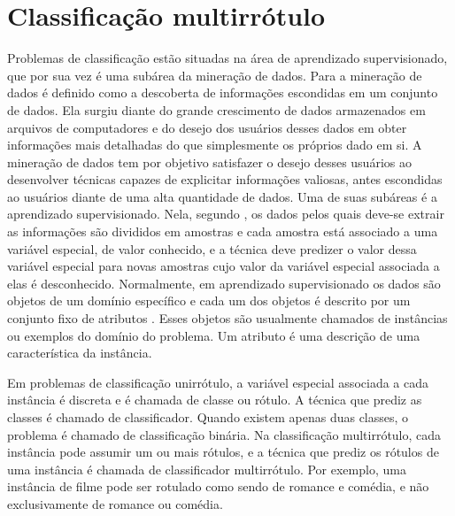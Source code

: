 \chapter{Classificação multirrótulo}

Problemas de classificação estão situadas na área de aprendizado supervisionado, que por sua vez é uma 
subárea da mineração de dados. Para \cite{dunham2003introductory} a mineração de dados é definido como a descoberta
de informações escondidas em um conjunto de dados. Ela surgiu diante do grande crescimento de dados armazenados
em arquivos de computadores e do desejo dos usuários desses dados em obter informações mais detalhadas do que simplesmente
os próprios dado em si. A mineração de dados tem por objetivo satisfazer o desejo desses usuários ao desenvolver técnicas
capazes de explicitar informações valiosas, antes escondidas ao usuários diante de uma alta quantidade de dados.
Uma de suas subáreas é a aprendizado supervisionado. Nela, segundo \cite{mohri2012foundations},
os dados pelos quais deve-se extrair as informações são divididos em amostras
e cada amostra está associado a uma variável especial, de valor conhecido,
e a técnica deve predizer o valor dessa variável especial para
novas amostras cujo valor da variável especial associada a elas é desconhecido. 
Normalmente, em aprendizado supervisionado os dados são objetos de um domínio específico e cada um dos objetos
é descrito por um conjunto fixo de atributos \cite{rezende2003sistemas}. 
Esses objetos são usualmente chamados de instâncias ou exemplos do domínio do problema.
Um atributo é uma descrição de uma característica da instância.

Em problemas de classificação unirrótulo, a variável especial associada a cada instância é discreta
e é chamada de classe ou rótulo. A técnica que prediz as classes é chamado de classificador.
Quando existem apenas duas classes, o problema é chamado de classificação binária.
Na classificação multirrótulo, cada instância pode assumir um ou mais rótulos, e a técnica
que prediz os rótulos de uma instância é chamada de classificador multirrótulo.
Por exemplo, uma instância de filme pode ser rotulado como sendo de romance e comédia, 
e não exclusivamente de romance ou comédia.

